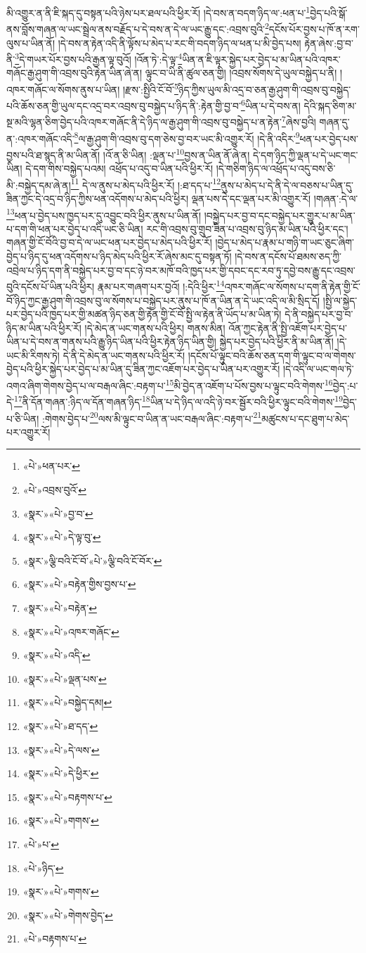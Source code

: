མི་འགྱུར་ན་ནི་ཇི་སྐད་དུ་བསྟན་པའི་ཉེས་པར་ཐལ་པའི་ཕྱིར་རོ། །དེ་བས་ན་བདག་ཉིད་ལ་:ཕན་པ་\footnote{«པེ་»ཕན་པར་}བྱེད་པའི་སྒོ་ནས་བློས་གཞན་ལ་ཡང་སྦྲེལ་ནས་བརྗོད་པ་དེ་བས་ན་དེ་ལ་ཡང་རྒྱུ་དང་:འབྲས་བུའི་\footnote{«པེ་»འབྲས་བུའོ་}དངོས་པོར་བྱས་པ་ཁོ་ན་རག་ལུས་པ་ཡིན་ནོ། །དེ་བས་ན་རྟེན་འདི་ནི་ལྟོས་པ་མེད་པ་རང་གི་བདག་ཉིད་ལ་ཕན་པ་མི་བྱེད་པས། རྟེན་ཞེས་:བྱ་བ་ནི་\footnote{«སྣར་»«པེ་»བྱ་བ་}དེ་གཡར་པོར་བྱས་པའི་རྒྱན་ལྟ་བུའོ། །འོན་ཏེ་:དེ་ལྟ་\footnote{«སྣར་»«པེ་»དེ་ལྟ་བུ་}ཡིན་ན་ཇི་ལྟར་སྐྱེད་པར་བྱེད་པ་མ་ཡིན་པའི་འཁར་གཞོང་རྒྱ་ཤུག་གི་འབྲས་བུའི་རྟེན་ཡིན་ཞེ་ན། ལྟུང་བ་ཡི་ནི་ཚུལ་ཅན་གྱི། །འབྲས་སོགས་དེ་ཡུལ་བསྐྱེད་པ་ནི། །འཁར་གཞོང་ལ་སོགས་ནུས་པ་ཡིན། །རྫས་:སྤྱིའི་ངོ་བོ་\footnote{«སྣར་»ལྕི་བའི་ངོ་བོ་«པེ་»ལྕི་བའི་ངོ་བོར་}ཉིད་ཀྱིས་ཡུལ་མི་འདྲ་བ་ཅན་རྒྱ་ཤུག་གི་འབྲས་བུ་བསྐྱེད་པའི་ཆོས་ཅན་གྱི་ཡུལ་དང་འདྲ་བར་འབྲས་བུ་བསྐྱེད་པ་ཉིད་ནི་:རྟེན་གྱི་བྱ་བ་\footnote{«སྣར་»«པེ་»བརྟེན་གྱིས་བྱས་པ་}ཡིན་པ་དེ་བས་ན། དེའི་སྐད་ཅིག་མ་སྔ་མའི་ལྷན་ཅིག་བྱེད་པའི་འཁར་གཞོང་ནི་དེ་ཉིད་ལ་རྒྱ་ཤུག་གི་འབྲས་བུ་བསྐྱེད་པ་ན་རྟེན་\footnote{«སྣར་»«པེ་»བརྟེན་}ཞེས་བྱའི། གཞན་དུ་ན་:འཁར་གཞོང་འདི་\footnote{«སྣར་»«པེ་»འཁར་གཞོང་}ལ་རྒྱ་ཤུག་གི་འབྲས་བུ་དག་ཅེས་བྱ་བར་ཡང་མི་འགྱུར་རོ། །དེ་ནི་འདིར་\footnote{«སྣར་»«པེ་»འདི་}ཕན་པར་བྱེད་པས་བྱས་པའི་ཐ་སྙད་ནི་མ་ཡིན་ནོ། །འོ་ན་ཅི་ཡིན། :ལྡན་པ་\footnote{«སྣར་»«པེ་»ལྡན་པས་}བྱས་ན་ཡིན་ནོ་ཞེ་ན། དེ་དག་ཉིད་ཀྱི་ལྡན་པ་དེ་ཡང་གང་ཡིན། དེ་དག་གིས་བསྐྱེད་པའམ། འཕྲོད་པ་འདུ་བ་ཡིན་པའི་ཕྱིར་རོ། །དེ་གཅིག་ཉིད་ལ་འཕྲོད་པ་འདུ་བས་ཅི་མི་:བསྐྱེད་དམ་ཞེ་ན།\footnote{«སྣར་»«པེ་»བསྐྱེད་དམ།} དེ་ལ་ནུས་པ་མེད་པའི་ཕྱིར་རོ། །:ཐ་དད་པ་\footnote{«སྣར་»«པེ་»ཐ་དད་}ནུས་པ་མེད་པ་དེ་ནི་དེ་ལ་བཅས་པ་ཡིན་དུ་ཟིན་ཀྱང་དེ་འདྲ་བ་ཉིད་ཀྱིས་ཕན་འདོགས་པ་མེད་པའི་ཕྱིར། ལྡན་པས་དེ་དང་ལྡན་པར་མི་འགྱུར་རོ། །གཞན་:དེ་ལ་\footnote{«སྣར་»«པེ་»དེ་ལས་}ཕན་པ་བྱེད་པས་ཁྱད་པར་དུ་འབྱུང་བའི་ཕྱིར་ནུས་པ་ཡིན་ནོ། །བསྐྱེད་པར་བྱ་བ་དང་བསྐྱེད་པར་གྱུར་པ་མ་ཡིན་པ་དག་གི་ཕན་པར་བྱེད་པ་འདི་ཡང་ཅི་ཡིན། རང་གི་འབྲས་བུ་གྲུབ་ཟིན་པ་འབྲས་བུ་ཉིད་མ་ཡིན་པའི་ཕྱིར་དང་། གཞན་གྱི་ངོ་བོའི་བྱ་བ་དེ་ལ་ཡང་ཕན་པར་བྱེད་པ་མེད་པའི་ཕྱིར་རོ། །བྱེད་པ་མེད་པ་རྣམ་པ་གཉི་ག་ཡང་ཅུང་ཞིག་བྱེད་པ་ཉིད་དུ་ཕན་འདོགས་པ་ཉིད་མེད་པའི་ཕྱིར་རོ་ཞེས་མང་དུ་བསྟན་ཏོ། །དེ་བས་ན་དངོས་པོ་ཐམས་ཅད་ཀྱི་འབྲེལ་པ་ཉིད་དག་ནི་བསྐྱེད་པར་བྱ་བ་དང་ཉེ་བར་མཁོ་བའི་ཁྱད་པར་གྱི་དབང་དང་རབ་ཏུ་དབྱེ་བས་རྒྱུ་དང་འབྲས་བུའི་དངོས་པོ་ཡིན་པའི་ཕྱིར། རྣམ་པར་གཞག་པར་བྱའོ། །:དེའི་ཕྱིར་\footnote{«སྣར་»«པེ་»དེ་ཕྱིར་}འཁར་གཞོང་ལ་སོགས་པ་དག་ནི་རྟེན་གྱི་ངོ་བོ་ཉིད་ཀྱང་རྒྱ་ཤུག་གི་འབྲས་བུ་ལ་སོགས་པ་བསྐྱེད་པར་ནུས་པ་ཁོ་ན་ཡིན་ན་དེ་ཡང་འདི་ལ་མི་སྲིད་དོ། །སྤྱི་ལ་སྐྱེད་པར་བྱེད་པའི་ཁྱད་པར་གྱི་མཚན་ཉིད་ཅན་གྱི་རྟེན་གྱི་ངོ་བོ་སྤྱི་ལ་རྟེན་ནི་ཡོད་པ་མ་ཡིན་ཏེ། དེ་ནི་བསྐྱེད་པར་བྱ་བ་ཉིད་མ་ཡིན་པའི་ཕྱིར་རོ། །དེ་མེད་ན་ཡང་གནས་པའི་ཕྱིར། གནས་མིན། འོན་ཀྱང་རྟེན་ནི་སྤྱི་འཇོག་པར་བྱེད་པ་ཡིན་པ་དེ་བས་ན་གནས་པའི་རྒྱུ་ཉིད་ཡིན་པའི་ཕྱིར་རྟེན་ཉིད་ཡིན་གྱི། སྐྱེད་པར་བྱེད་པའི་ཕྱིར་ནི་མ་ཡིན་ནོ། །དེ་ཡང་མི་རིགས་ཏེ། དེ་ནི་དེ་མེད་ན་ཡང་གནས་པའི་ཕྱིར་རོ། །དངོས་པོ་ལྟུང་བའི་ཆོས་ཅན་དག་གི་ལྟུང་བ་ལ་གེགས་བྱེད་པའི་ཕྱིར་སྐྱེད་པར་བྱེད་པ་མ་ཡིན་དུ་ཟིན་ཀྱང་འཇོག་པར་བྱེད་པ་ཡིན་པར་འགྱུར་རོ། །དེ་འདི་ལ་ཡང་གལ་ཏེ་འགའ་ཞིག་གེགས་བྱེད་པ་ལ་བརྒལ་ཞིང་:བརྟག་པ་\footnote{«སྣར་»«པེ་»བརྟགས་པ་}མི་བྱེད་ན་འཇོག་པ་པོས་བྱས་པ་ལྟུང་བའི་གེགས་\footnote{«སྣར་»«པེ་»གགས་}བྱེད་:པ་དེ་\footnote{«པེ་»པ་}ནི་དོན་གཞན་:ཉིད་ལ་དོན་གཞན་ཉིད་\footnote{«པེ་»ཉིད་}ཡིན་པ་དེ་ཉིད་ལ་འདི་ཉེ་བར་སྦྱོར་བའི་ཕྱིར་ལྟུང་བའི་གེགས་\footnote{«སྣར་»«པེ་»གགས་}བྱེད་པ་ཅི་ཡིན། :གེགས་བྱེད་པ་\footnote{«སྣར་»«པེ་»གེགས་བྱེད་}ལས་མི་ལྟུང་བ་ཡིན་ན་ཡང་བརྒལ་ཞིང་:བརྟག་པ་\footnote{«པེ་»བརྟགས་པ་}མཚུངས་པ་དང་ཐུག་པ་མེད་པར་འགྱུར་རོ། 